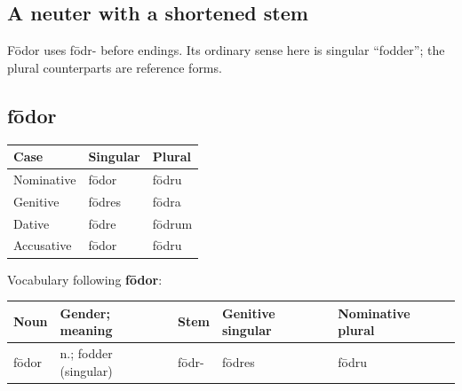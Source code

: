 \subsection*{A neuter with a shortened stem}

Fōdor uses fōdr- before endings. Its ordinary sense here is singular “fodder”; the plural counterparts are reference forms.

\subsection*{fōdor}

\par\begingroup
\fontsize{10.5}{13.2}\selectfont
\setlength{\LTleft}{0pt}\setlength{\LTright}{\fill}
\noindent
\begin{tabular}{@{}>{\raggedright\arraybackslash}p{39.46mm}>{\raggedright\arraybackslash}p{39.46mm}>{\raggedright\arraybackslash}p{39.46mm}@{}}
\toprule
\textbf{Case} & \textbf{Singular} & \textbf{Plural} \\
\midrule
Nominative & fōdor & fōdru \\
Genitive & fōdres & fōdra \\
Dative & fōdre & fōdrum \\
Accusative & fōdor & fōdru \\
\bottomrule
\end{tabular}
\par\endgroup

Vocabulary following \textbf{fōdor}:

\par\begingroup
\fontsize{10.5}{13.2}\selectfont
\setlength{\LTleft}{0pt}\setlength{\LTright}{\fill}
\noindent
\begin{tabular}{@{}>{\raggedright\arraybackslash}p{18.75mm}>{\raggedright\arraybackslash}p{28.02mm}>{\raggedright\arraybackslash}p{18.75mm}>{\raggedright\arraybackslash}p{22.59mm}>{\raggedright\arraybackslash}p{24.65mm}@{}}
\toprule
\textbf{Noun} & \textbf{Gender; meaning} & \textbf{Stem} & \textbf{Genitive singular} & \textbf{Nominative plural} \\
\midrule
fōdor & n.; fodder (singular) & fōdr- & fōdres & fōdru \\
\bottomrule
\end{tabular}
\par\endgroup

